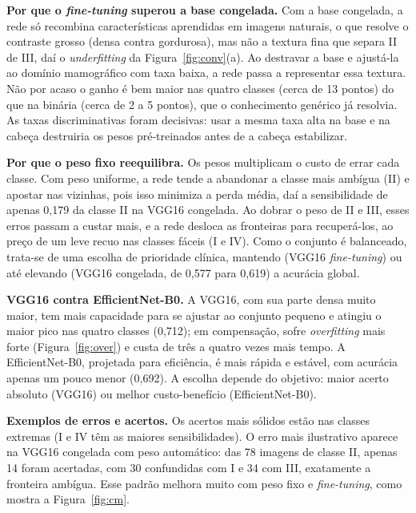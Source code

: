 \documentclass[twocolumn,a4paper,11pt]{article}
\begin{document}
\textbf{Por que o \emph{fine\nobreakdash-tuning} superou a base congelada.} Com a base
congelada, a rede só recombina características aprendidas em imagens naturais, o que
resolve o contraste grosso (densa contra gordurosa), mas não a textura fina que
separa II de III, daí o \emph{underfitting} da Figura~\ref{fig:conv}(a). Ao
destravar a base e ajustá\nobreakdash-la ao domínio mamográfico com taxa baixa, a rede passa
a representar essa textura. Não por acaso o ganho é bem maior nas quatro classes
(cerca de 13 pontos) do que na binária (cerca de 2 a 5 pontos), que o conhecimento
genérico já resolvia. As taxas discriminativas foram decisivas: usar a mesma taxa
alta na base e na cabeça destruiria os pesos pré\nobreakdash-treinados antes de a cabeça
estabilizar.

\textbf{Por que o peso fixo reequilibra.} Os pesos multiplicam o custo de errar
cada classe. Com peso uniforme, a rede tende a abandonar a classe mais ambígua (II)
e apostar nas vizinhas, pois isso minimiza a perda média, daí a sensibilidade de
apenas 0,179 da classe II na VGG16 congelada. Ao dobrar o peso de II e III, esses
erros passam a custar mais, e a rede desloca as fronteiras para recuperá\nobreakdash-los, ao
preço de um leve recuo nas classes fáceis (I e IV). Como o conjunto é balanceado,
trata\nobreakdash-se de uma escolha de prioridade clínica, mantendo (VGG16 \emph{fine\nobreakdash-tuning})
ou até elevando (VGG16 congelada, de 0,577 para 0,619) a acurácia global.

\textbf{VGG16 contra EfficientNet\nobreakdash-B0.} A VGG16, com sua parte densa muito maior,
tem mais capacidade para se ajustar ao conjunto pequeno e atingiu o maior pico nas
quatro classes (0,712); em compensação, sofre \emph{overfitting} mais forte
(Figura~\ref{fig:over}) e custa de três a quatro vezes mais tempo. A
EfficientNet\nobreakdash-B0, projetada para eficiência, é mais rápida e estável, com acurácia
apenas um pouco menor (0,692). A escolha depende do objetivo: maior acerto absoluto
(VGG16) ou melhor custo\nobreakdash-benefício (EfficientNet\nobreakdash-B0).

\textbf{Exemplos de erros e acertos.} Os acertos mais sólidos estão nas classes
extremas (I e IV têm as maiores sensibilidades). O erro mais ilustrativo aparece na
VGG16 congelada com peso automático: das 78 imagens de classe II, apenas 14 foram
acertadas, com 30 confundidas com I e 34 com III, exatamente a fronteira ambígua.
Esse padrão melhora muito com peso fixo e \emph{fine\nobreakdash-tuning}, como mostra a
Figura~\ref{fig:cm}.
\end{document}
